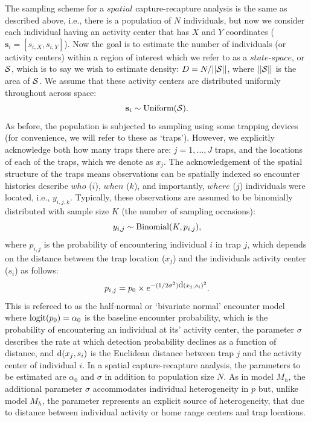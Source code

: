 \documentclass{book}
\begin{document}
The sampling scheme for a $spatial$ capture-recapture analysis is the
same as described above, i.e., there is a population of $N$
individuals, but now we consider each individual having an activity
center that has $X$ and $Y$ coordinates
($\textbf{s}_i=[s_{i,X},s_{i,Y}]$). Now the goal is to estimate the
number of individuals (or activity centers) within a region of
interest which we refer to as a $state$-$space$, or ${\cal S}$, which
is to say we wish to estimate density: $D = N/||{\cal S}||$, where
$||{\cal S}||$ is the area of ${\cal S}$. We assume that these
activity centers are distributed uniformly throughout across space:
\[
\textbf{s}_i \sim \hbox{Uniform}({\cal S}).
\]
As before, the population is subjected to sampling using some trapping
devices (for convenience, we will refer to these as `traps'). However,
we explicitly acknowledge both how many traps there are: $j=1,...,J$
traps, and the locations of each of the traps, which we denote as $x_j$.
The acknowledgement of the spatial structure of the traps means observations can be spatially indexed so encounter
histories describe $who$ ($i$), $when$ ($k$), and importantly, $where$
($j$) individuals were located, i.e., $y_{i,j,k}$. Typically, these
observations are assumed to be binomially distributed with sample size
$K$ (the number of sampling occasions):
\[
y_{i,j} \sim \hbox{Binomial}(K,p_{i,j}),
\]
where $p_{i,j}$ is the probability of encountering individual $i$ in
trap $j$, which depends on the distance between the trap location
($x_j$) and the individuals activity center ($s_i$) as follows:
\begin{equation}
p_{i,j} = p_0 \times e^{-(1/2\sigma^2) \hbox{d}(x_{j},s_{i})^{2}}.
\end{equation}
This is refereed to as the half-normal or `bivariate normal' encounter
model where $\hbox{logit}(p_0) = \alpha_0$ is the baseline encounter
probability, which is the probability of encountering an individual at
its' activity center, the parameter $\sigma$ describes the rate at
which detection probability declines as a function of distance, and
$\hbox{d}(x_{j},s_{i})$ is the Euclidean distance between trap $j$ and
the activity center of individual $i$. In a spatial capture-recapture
analysis, the parameters to be estimated are $\alpha_0$ and $\sigma$
in addition to population size $N$.  As in model $M_h$, the additional
parameter $\sigma$ accommodates individual heterogeneity in $p$ but,
unlike model $M_h$, the parameter represents an explicit source of
heterogeneity, that due to distance between individual activity or
home range centers and trap locations.
\end{document}
